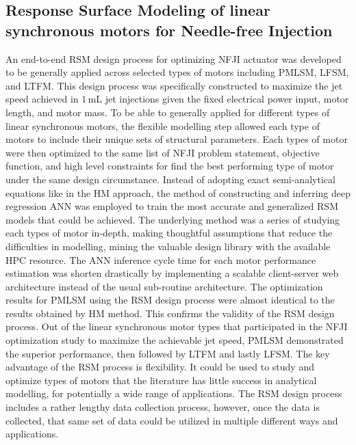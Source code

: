     
    \subsection{Response Surface Modeling of linear synchronous motors for Needle-free Injection}
    
    
        An end-to-end \acf{RSM} design process for optimizing \acs{NFJI} actuator was developed to be generally applied across selected types of motors including \acs{PMLSM}, \acf{LFSM}, and \acf{LTFM}. This design process was specifically constructed to maximize the jet speed achieved in $1\,\mathrm{mL}$ jet injections given the fixed electrical power input, motor length, and motor mass. To be able to generally applied for different types of linear synchronous motors, the flexible modelling step allowed each type of motors to include their unique sets of structural parameters. Each types of motor were then optimized to the same list of \acs{NFJI} problem statement, objective function, and high level constraints for find the best performing type of motor under the same design circumstance. Instead of adopting exact semi-analytical equations like in the \acs{HM} approach, the method of constructing and inferring deep regression \acf{ANN} was employed to train the most accurate and generalized \acs{RSM} models that could be achieved. The underlying method was a series of studying each types of motor in-depth, making thoughtful assumptions that reduce the difficulties in modelling, mining the valuable design library with the available \acf{HPC} resource. The \acs{ANN} inference cycle time for each motor performance estimation was shorten drastically by implementing a scalable client-server web architecture instead of the usual sub-routine architecture. The optimization results for \acs{PMLSM} using the \acf{RSM} design process were almost identical to the results obtained by \acf{HM} method. This confirms the validity of the \acf{RSM} design process. Out of the linear synchronous motor types that participated in the \acs{NFJI} optimization study to maximize the achievable jet speed, \acs{PMLSM} demonstrated the superior performance, then followed by \acs{LTFM} and lastly \acs{LFSM}. The key advantage of the \acs{RSM} process is flexibility. It could be used to study and optimize types of motors that the literature has little success in analytical modelling, for potentially a wide range of applications. The \acs{RSM} design process includes a rather lengthy data collection process, however, once the data is collected, that same set of data could be utilized in multiple different ways and applications.
        
